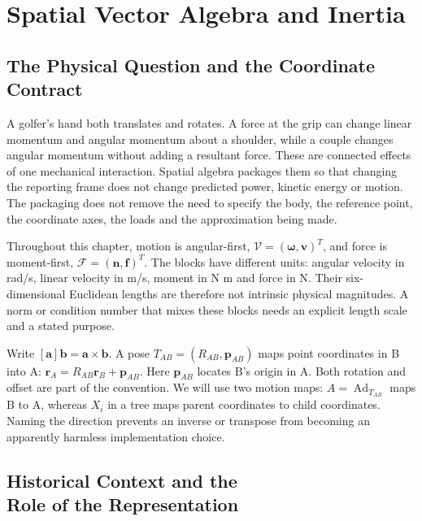 \chapter{Spatial Vector Algebra and Inertia}
\label{ch:spatial_algebra}

\section{The Physical Question and the Coordinate Contract}
\label{laymans:context_box}

A golfer's hand both translates and rotates. A force at the grip can change linear momentum and angular momentum about a shoulder, while a couple changes angular momentum without adding a resultant force. These are connected effects of one mechanical interaction. Spatial algebra packages them so that changing the reporting frame does not change predicted power, kinetic energy or motion. The packaging does not remove the need to specify the body, the reference point, the coordinate axes, the loads and the approximation being made.

Throughout this chapter, motion is angular-first, $\mathcal V=(\boldsymbol\omega,\mathbf v)^T$, and force is moment-first, $\mathcal F=(\mathbf n,\mathbf f)^T$. The blocks have different units: angular velocity in rad/s, linear velocity in m/s, moment in N m and force in N. Their six-dimensional Euclidean lengths are therefore not intrinsic physical magnitudes. A norm or condition number that mixes these blocks needs an explicit length scale and a stated purpose.

Write $[\mathbf a]\mathbf b=\mathbf a\times\mathbf b$. A pose $T_{AB}=(R_{AB},\mathbf p_{AB})$ maps point coordinates in B into A: $\mathbf r_A=R_{AB}\mathbf r_B+\mathbf p_{AB}$. Here $\mathbf p_{AB}$ locates B's origin in A. Both rotation and offset are part of the convention. We will use two motion maps: $A=\operatorname{Ad}_{T_{AB}}$ maps B to A, whereas $X_i$ in a tree maps parent coordinates to child coordinates. Naming the direction prevents an inverse or transpose from becoming an apparently harmless implementation choice.

\section[Historical Context and the Role of the Representation]{Historical Context and the\\Role of the Representation}
\label{sec:history_spatial_algebra}

